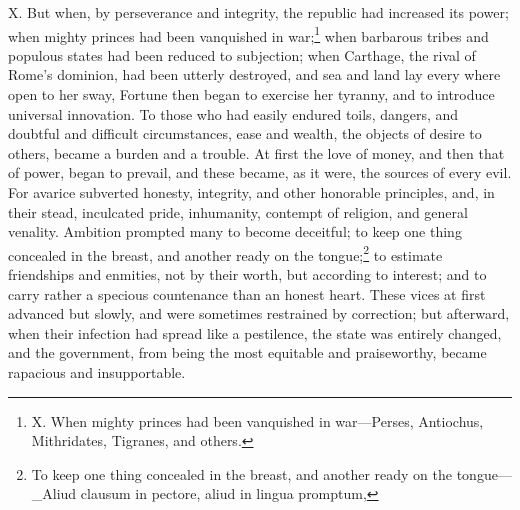X. But when, by perseverance and integrity, the republic had increased
its power; when mighty princes had been vanquished in war;\footnote{X. When mighty princes had been vanquished in war—Perses,
Antiochus, Mithridates, Tigranes, and others.} when
barbarous tribes and populous states had been reduced to subjection;
when Carthage, the rival of Rome's dominion, had been utterly
destroyed, and sea and land lay every where open to her sway, Fortune
then began to exercise her tyranny, and to introduce universal
innovation. To those who had easily endured toils, dangers, and
doubtful and difficult circumstances, ease and wealth, the objects of
desire to others, became a burden and a trouble. At first the love of
money, and then that of power, began to prevail, and these became, as
it were, the sources of every evil. For avarice subverted honesty,
integrity, and other honorable principles, and, in their stead,
inculcated pride, inhumanity, contempt of religion, and general
venality. Ambition prompted many to become deceitful; to keep one
thing concealed in the breast, and another ready on the tongue;\footnote{To keep one thing concealed in the breast, and another ready
on the tongue—\_Aliud clausum in pectore, aliud in lingua promptum,} to
estimate friendships and enmities, not by their worth, but according
to interest; and to carry rather a specious countenance than an honest
heart. These vices at first advanced but slowly, and were sometimes
restrained by correction; but afterward, when their infection had
spread like a pestilence, the state was entirely changed, and the
government, from being the most equitable and praiseworthy, became
rapacious and insupportable.

